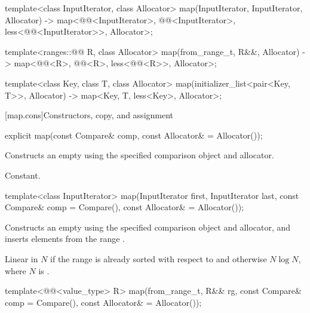 \begin{codeblock}
{  template<class InputIterator, class Allocator>
    map(InputIterator, InputIterator, Allocator)
      -> map<@@<InputIterator>, @@<InputIterator>,
             less<@@<InputIterator>>, Allocator>;

  template<ranges::@@ R, class Allocator>
    map(from_range_t, R&&, Allocator)
      -> map<@@<R>, @@<R>, less<@@<R>>, Allocator>;

  template<class Key, class T, class Allocator>
    map(initializer_list<pair<Key, T>>, Allocator) -> map<Key, T, less<Key>, Allocator>;
}
\end{codeblock}


[map.cons]{Constructors, copy, and assignment}%
%

%
\begin{itemdecl}
explicit map(const Compare& comp, const Allocator& = Allocator());
\end{itemdecl}

\begin{itemdescr}
\pnum
\effects
Constructs an empty
using the specified comparison object and allocator.

\pnum
\complexity
Constant.
\end{itemdescr}

%
\begin{itemdecl}
template<class InputIterator>
  map(InputIterator first, InputIterator last,
      const Compare& comp = Compare(), const Allocator& = Allocator());
\end{itemdecl}

\begin{itemdescr}
\pnum
\effects
Constructs an empty
using the specified comparison object and allocator,
and inserts elements from the range
.

\pnum
\complexity
Linear in $N$ if the range
is already sorted with respect to 
and otherwise $N \log N$, where $N$
is .
\end{itemdescr}

%
\begin{itemdecl}
template<@@<value_type> R>
  map(from_range_t, R&& rg, const Compare& comp = Compare(), const Allocator& = Allocator());
\end{itemdecl}

